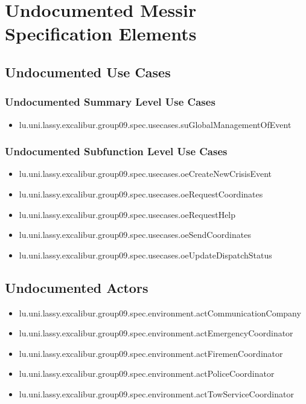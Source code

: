 	
\chapter{Undocumented Messir Specification Elements}


\section[Undocumented Use Cases]{Undocumented Use Cases}

\subsection[Undocumented Use Cases - Summary Level]{Undocumented Summary Level Use Cases}
\begin{itemize}
\item lu.uni.lassy.excalibur.group09.spec.usecases.suGlobalManagementOfEvent 
\end{itemize}


\subsection[Undocumented Use Cases - Subfunction Level]{Undocumented Subfunction Level Use Cases}
\begin{itemize}
\item lu.uni.lassy.excalibur.group09.spec.usecases.oeCreateNewCrisisEvent 
\item lu.uni.lassy.excalibur.group09.spec.usecases.oeRequestCoordinates 
\item lu.uni.lassy.excalibur.group09.spec.usecases.oeRequestHelp 
\item lu.uni.lassy.excalibur.group09.spec.usecases.oeSendCoordinates 
\item lu.uni.lassy.excalibur.group09.spec.usecases.oeUpdateDispatchStatus 
\end{itemize}







\section[Undocumented Actors]{Undocumented Actors}
\begin{itemize}
\item lu.uni.lassy.excalibur.group09.spec.environment.actCommunicationCompany 
\item lu.uni.lassy.excalibur.group09.spec.environment.actEmergencyCoordinator 
\item lu.uni.lassy.excalibur.group09.spec.environment.actFiremenCoordinator 
\item lu.uni.lassy.excalibur.group09.spec.environment.actPoliceCoordinator 
\item lu.uni.lassy.excalibur.group09.spec.environment.actTowServiceCoordinator 
\end{itemize}




